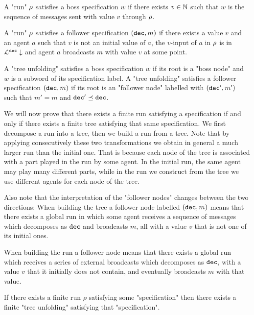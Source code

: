 \begin{definition}
	A "run" $\rho$ satisfies a boss specification $w$ if there exists $v \in \mathbb{N}$ such that $w$ is the sequence of messages sent with value $v$ through $\rho$.
	
	A "run" $\rho$ satisfies a follower specification $(\mathtt{dec}, m)$ if there exists a value $v$ and an agent $a$ such that $v$ is not an initial value of $a$, the $v$-input of $a$ in $\rho$ is in $\mathcal{L}^{\mathtt{\mathtt{dec}}}\downarrow$ and agent $a$ broadcasts $m$ with value $v$ at some point.
	
	A "tree unfolding" satisfies a boss specification $w$ if its root is a "boss node" and $w$ is a subword of its specification label.
	A "tree unfolding" satisfies a follower specification $(\mathtt{dec} ,m)$ if its root is an "follower node" labelled with $(\mathtt{dec}',m')$ such that $m'=m$ and  $\mathtt{dec}' \preceq \mathtt{dec}$.
\end{definition}

We will now prove that there exists a finite run satisfying a specification if and only if there exists a finite tree satisfying that same specification.
We first decompose a run into a tree, then we build a run from a tree. Note that by applying consecutively these two transformations we obtain in general a much larger run than the initial one. That is because each node of the tree is associated with a part played in the run by some agent. In the initial run, the same agent may play many different parts, while in the run we construct from the tree we use different agents for each node of the tree.

Also note that the interpretation of the "follower nodes" changes between the two directions: When building the tree a follower node labelled $(\mathtt{dec} ,m)$ means that there exists a global run in which some agent receives a sequence of messages which decomposes as  $\mathtt{dec}$ and broadcasts $m$, all with a value $v$ that is not one of its initial ones.

When building the run a follower node means that there exists a global run which receives a series of external broadcasts which decomposes as $\mathtt{dec}$, with a value $v$ that it initially does not contain, and eventually broadcasts $m$ with that value.

\begin{lemma}
	If there exists a finite run $\rho$ satisfying some "specification" then there exists a finite "tree unfolding" satisfying that "specification".
\end{lemma}

